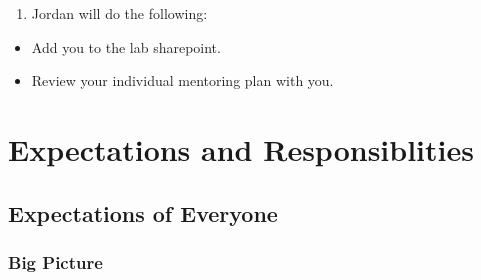 \documentclass[
]{book}
\providecommand{\tightlist}{%
  \setlength{\itemsep}{0pt}\setlength{\parskip}{0pt}}
\begin{document}
\begin{enumerate}
\def\labelenumi{\arabic{enumi}.}
\setcounter{enumi}{3}
\tightlist
\item
  Jordan will do the following:
\end{enumerate}

\begin{itemize}
\tightlist
\item
  Add you to the lab sharepoint.
\item
  Review your individual mentoring plan with you.
\end{itemize}

\hypertarget{expectations-and-responsiblities}{%
\chapter{Expectations and Responsiblities}\label{expectations-and-responsiblities}}

\hypertarget{everyone}{%
\section{Expectations of Everyone}\label{everyone}}

\hypertarget{big-picture}{%
\subsection{Big Picture}\label{big-picture}}
\end{document}

